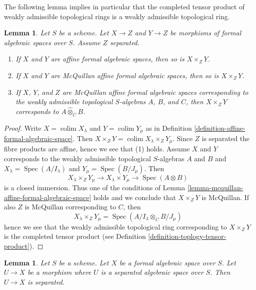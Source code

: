 \documentclass{stacks-project}
\theoremstyle{plain}
\newtheorem{lemma}[subsection]{Lemma}
\theoremstyle{definition}
\theoremstyle{remark}
\numberwithin{equation}{subsection}
\def\colim{\mathop{\mathrm{colim}}\nolimits}
\def\Spec{\mathop{\mathrm{Spec}}}
\begin{document}
\noindent
The following lemma implies in particular that the completed
tensor product of weakly admissible topological rings is
a weakly admissible topological ring.

\begin{lemma}
\label{lemma-fibre-product-affines-over-separated}
Let $S$ be a scheme. Let $X \to Z$ and $Y \to Z$ be morphisms
of formal algebraic spaces over $S$. Assume $Z$ separated.
\begin{enumerate}
\item If $X$ and $Y$ are affine formal algebraic spaces, then
so is $X \times_Z Y$.
\item If $X$ and $Y$ are McQuillan affine formal algebraic spaces, then
so is $X \times_Z Y$.
\item If $X$, $Y$, and $Z$ are McQuillan affine formal algebraic spaces
corresponding to the weakly admissible topological $S$-algebras
$A$, $B$, and $C$, then $X \times_Z Y$ corresponds to
$A \widehat{\otimes}_C B$.
\end{enumerate}
\end{lemma}

\begin{proof}
Write $X = \colim X_\lambda$ and $Y = \colim Y_\mu$ as
in Definition \ref{definition-affine-formal-algebraic-space}.
Then $X \times_Z Y = \colim X_\lambda \times_Z Y_\mu$.
Since $Z$ is separated the fibre products are affine, hence
we see that (1) holds. Assume $X$ and $Y$ corresponds to
the weakly admissible topological $S$-algebras $A$ and $B$
and $X_\lambda = \Spec(A/I_\lambda)$ and $Y_\mu = \Spec(B/J_\mu)$.
Then
$$
X_\lambda \times_Z Y_\mu \to
X_\lambda \times Y_\mu \to \Spec(A \otimes B)
$$
is a closed immersion. Thus one of the conditions of
Lemma \ref{lemma-mcquillan-affine-formal-algebraic-space}
holds and we conclude that $X \times_Z Y$ is McQuillan.
If also $Z$ is McQuillan corresponding to $C$, then
$$
X_\lambda \times_Z Y_\mu = \Spec(A/I_\lambda \otimes_C B/J_\mu)
$$
hence we see that the weakly admissible topological ring
corresponding to $X \times_Z Y$ is the completed tensor product
(see Definition \ref{definition-toplogy-tensor-product}).
\end{proof}

\begin{lemma}
\label{lemma-separated-from-separated}
Let $S$ be a scheme. Let $X$ be a formal algebraic space over $S$.
Let $U \to X$ be a morphism where $U$ is a separated algebraic
space over $S$. Then $U \to X$ is separated.
\end{lemma}
\end{document}
